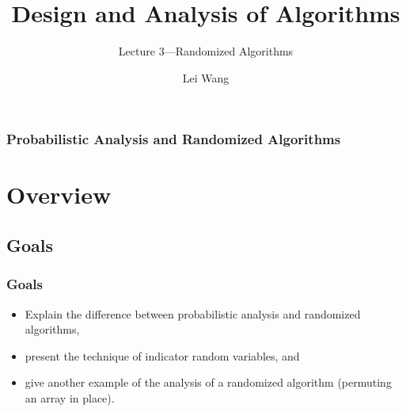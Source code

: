 \documentclass[notes,serif]{beamer}
\title{Design and Analysis of Algorithms}
\subtitle{Lecture 3---Randomized Algorithms}
\author{Lei Wang}
\institute{Dalian University of Technology}
\def\defn#1{{\color{red} #1}}
\begin{document}
\begin{frame}
  \titlepage
\end{frame}

\begin{frame}
  \frametitle{Probabilistic Analysis and Randomized Algorithms}
  \tableofcontents
\end{frame}

\section{Overview}
\subsection{Goals}

\begin{frame}
\frametitle{Goals}
\begin{itemize}
    \item Explain the difference between probabilistic analysis and randomized algorithms,
    \item present the technique of indicator random variables, and
    \item give another example of the analysis of a randomized algorithm (permuting an array in place).
\end{itemize}

%
%
%
%
%
%
%
%
%
%
%
%
%
\end{frame}
\end{document}
